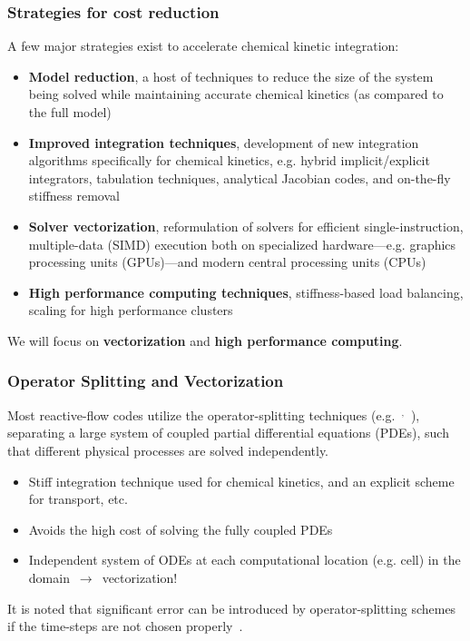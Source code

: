 \documentclass{beamer}
\begin{document}
\begin{frame}
 \frametitle{Strategies for cost reduction}
 A few major strategies exist to accelerate chemical kinetic integration:
 \begin{itemize}
  \item \textbf{Model reduction}, a host of techniques to reduce the size of the system being solved while maintaining accurate chemical kinetics (as compared to the full model)
  \item \textbf{Improved integration techniques}, development of new integration algorithms specifically for chemical kinetics, e.g. hybrid implicit\slash explicit integrators, tabulation techniques, analytical Jacobian codes, and on-the-fly stiffness removal
  \item \textbf{Solver vectorization}, reformulation of solvers for efficient single-instruction, multiple-data (SIMD) execution both on specialized hardware---e.g. graphics processing units (GPUs)---and modern central processing units (CPUs)
  \item \textbf{High performance computing techniques}, stiffness-based load balancing, scaling for high performance clusters
 \end{itemize}
 We will focus on \textbf{vectorization} and \textbf{high performance computing}.
\end{frame}

\begin{frame}
 \frametitle{Operator Splitting and Vectorization}
 Most reactive-flow codes utilize the operator-splitting techniques (e.g.~$^{,}$~), separating a large system of coupled partial differential equations (PDEs), such that different physical processes are solved independently.
 \begin{itemize}
  \item Stiff integration technique used for chemical kinetics, and an explicit scheme for transport, etc.
  \item Avoids the high cost of solving the fully coupled PDEs
  \item Independent system of ODEs at each computational location (e.g. cell) in the domain~$\rightarrow$~vectorization!
 \end{itemize}
 It is noted that significant error can be introduced by operator-splitting schemes if the time-steps are not chosen properly~.
\end{frame}
\end{document}

